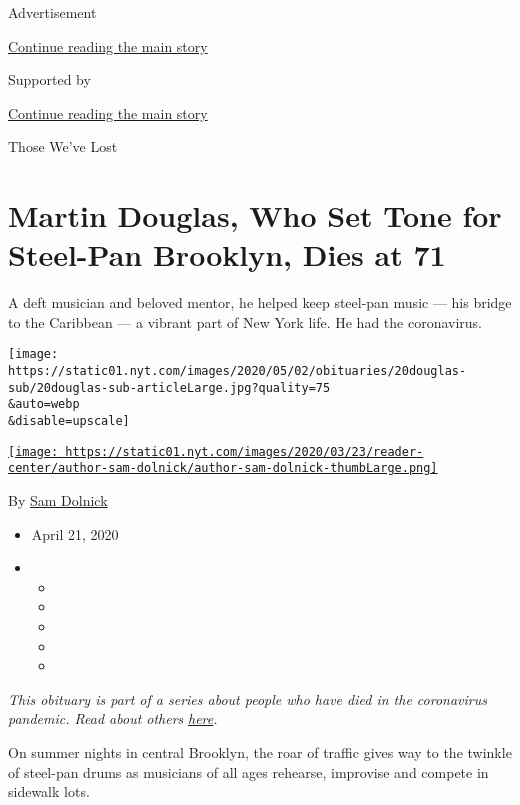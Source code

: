 Advertisement

\protect\hyperlink{after-top}{Continue reading the main story}

Supported by

\protect\hyperlink{after-sponsor}{Continue reading the main story}

Those We've Lost

\hypertarget{martin-douglas-who-set-tone-for-steel-pan-brooklyn-dies-at-71}{%
\section{Martin Douglas, Who Set Tone for Steel-Pan Brooklyn, Dies at
71}\label{martin-douglas-who-set-tone-for-steel-pan-brooklyn-dies-at-71}}

A deft musician and beloved mentor, he helped keep steel-pan music ---
his bridge to the Caribbean --- a vibrant part of New York life. He had
the coronavirus.

\texttt{[image: https://static01.nyt.com/images/2020/05/02/obituaries/20douglas-sub/20douglas-sub-articleLarge.jpg?quality=75\\\&auto=webp\\\&disable=upscale]}

\href{https://www.nytimes.com/by/sam-dolnick}{\texttt{[image: https://static01.nyt.com/images/2020/03/23/reader-center/author-sam-dolnick/author-sam-dolnick-thumbLarge.png]}}

By \href{https://www.nytimes.com/by/sam-dolnick}{Sam Dolnick}

\begin{itemize}
\item
  April 21, 2020
\item
  \begin{itemize}
  \item
  \item
  \item
  \item
  \item
  \end{itemize}
\end{itemize}

\emph{This obituary is part of a series about people who have died in
the coronavirus pandemic. Read about others}
\href{https://www.nytimes.com/series/people-who-have-died-of-the-coronavirus}{\emph{here}}\emph{.}

On summer nights in central Brooklyn, the roar of traffic gives way to
the twinkle of steel-pan drums as musicians of all ages rehearse,
improvise and compete in sidewalk lots.


